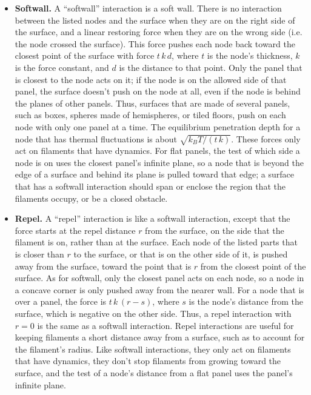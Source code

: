 \documentclass {scrbook}
\begin{document}
\begin{itemize}
\item \textbf{Softwall.} A ``softwall'' interaction is a soft wall. There is no interaction between the listed nodes and the surface when they are on the right side of the surface, and a linear restoring force when they are on the wrong side (i.e. the node crossed the surface). This force pushes each node back toward the closest point of the surface with force $t\,k\,d$, where $t$ is the node's thickness, $k$ is the force constant, and $d$ is the distance to that point. Only the panel that is closest to the node acts on it; if the node is on the allowed side of that panel, the surface doesn't push on the node at all, even if the node is behind the planes of other panels. Thus, surfaces that are made of several panels, such as boxes, spheres made of hemispheres, or tiled floors, push on each node with only one panel at a time. The equilibrium penetration depth for a node that has thermal fluctuations is about $\sqrt{k_BT/(t\,k)}$. These forces only act on filaments that have dynamics. For flat panels, the test of which side a node is on uses the closest panel's infinite plane, so a node that is beyond the edge of a surface and behind its plane is pulled toward that edge; a surface that has a softwall interaction should span or enclose the region that the filaments occupy, or be a closed obstacle.

\item \textbf{Repel.} A ``repel'' interaction is like a softwall interaction, except that the force starts at the repel distance $r$ from the surface, on the side that the filament is on, rather than at the surface. Each node of the listed parts that is closer than $r$ to the surface, or that is on the other side of it, is pushed away from the surface, toward the point that is $r$ from the closest point of the surface. As for softwall, only the closest panel acts on each node, so a node in a concave corner is only pushed away from the nearer wall. For a node that is over a panel, the force is $t\,k\,(r-s)$, where $s$ is the node's distance from the surface, which is negative on the other side. Thus, a repel interaction with $r=0$ is the same as a softwall interaction. Repel interactions are useful for keeping filaments a short distance away from a surface, such as to account for the filament's radius. Like softwall interactions, they only act on filaments that have dynamics, they don't stop filaments from growing toward the surface, and the test of a node's distance from a flat panel uses the panel's infinite plane.


\end{itemize}
\end{document}
